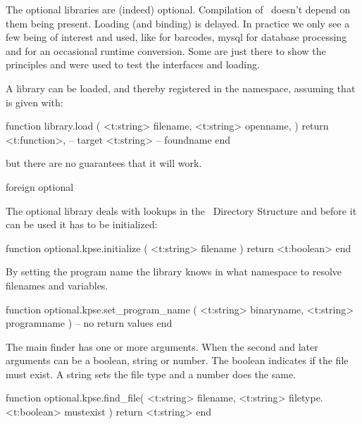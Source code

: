 \stopsubsection

\stopsection

\startsection[title={Optional}]

\startsubsection[title=Loading]

The optional libraries are (indeed) optional. Compilation of \LUAMETATEX\ doesn't
depend on them being present. Loading (and binding) is delayed. In practice we
only see a few being of interest and used, like  for barcodes, \type
{mysql} for database processing and  for an occasional
runtime conversion. Some are just there to show the principles and were used to
test the interfaces and loading.

A library can be loaded, and thereby registered in the 
namespace, assuming that  is given with:

\starttyping[option=LUA]
function library.load (
    <t:string> filename,
    <t:string> openname,
)
    return
        <t:function>, -- target
        <t:string>    -- foundname
end
\stoptyping

but there are no guarantees that it will work.

\stopsubsection

\startsubsection[title=Management]

\starttyping
foreign
optional
\stoptyping

\stopsubsection

\startsubsection[title=TDS (kpse)]

The optional  library deals with lookups in the \TEX\ Directory
Structure and before it can be used it has to be initialized:

\starttyping[option=LUA]
function optional.kpse.initialize ( <t:string> filename )
    return <t:boolean>
end
\stoptyping

By setting the program name the library knows in what namespace to resolve
filenames and variables.

\starttyping[option=LUA]
function optional.kpse.set_program_name (
    <t:string> binaryname,
    <t:string> programname
)
    -- no return values
end
\stoptyping

The main finder has one or more arguments. When the second and later arguments
can be a boolean, string or number. The boolean indicates if the file must exist.
A string sets the file type and a number does the same.

\starttyping[option=LUA]
function optional.kpse.find_file(
    <t:string>  filename,
    <t:string>  filetype.
    <t:boolean> mustexist
)
    return <t:string>
end
\stoptyping

